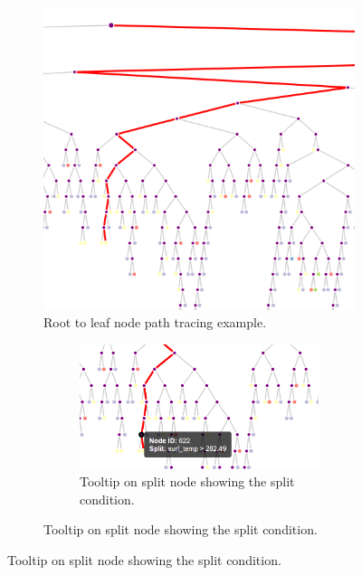 \begin{figure}[htbp]
    \centering
    \begin{subfigure}[c]{0.6\textwidth}
        \centering
        \includegraphics[height=\textwidth]{images/first highlight on click.png}
        \caption{Root to leaf node path tracing example.}
        \label{fig:Root-to-leaf}
    \end{subfigure}%
    \hspace{0.05\textwidth}%
    \begin{subfigure}[c]{0.3\textwidth}
        \centering
        \begin{subfigure}[c]{\textwidth}
            \centering
            \includegraphics[width=\textwidth]{images/first tooltip split node.png}
            \caption{Tooltip on split node showing the split condition.}
            \label{fig:split-tooltip}
        \end{subfigure}
        

\end{subfigure}
\end{figure}
